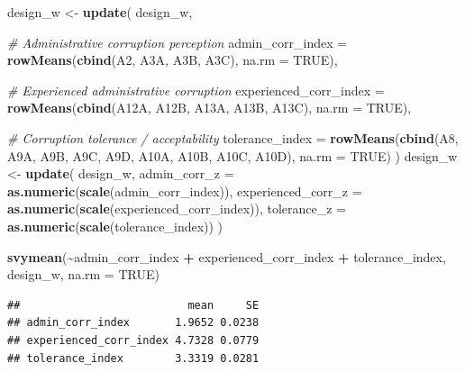 \documentclass[
]{article}
\newenvironment{Shaded}{\begin{snugshade}}{\end{snugshade}}
\newcommand{\AttributeTok}[1]{\textcolor[rgb]{0.13,0.29,0.53}{#1}}
\newcommand{\CommentTok}[1]{\textcolor[rgb]{0.56,0.35,0.01}{\textit{#1}}}
\newcommand{\ConstantTok}[1]{\textcolor[rgb]{0.56,0.35,0.01}{#1}}
\newcommand{\FunctionTok}[1]{\textcolor[rgb]{0.13,0.29,0.53}{\textbf{#1}}}
\newcommand{\NormalTok}[1]{#1}
\newcommand{\OtherTok}[1]{\textcolor[rgb]{0.56,0.35,0.01}{#1}}
\newcommand{\SpecialCharTok}[1]{\textcolor[rgb]{0.81,0.36,0.00}{\textbf{#1}}}
\begin{document}
\begin{Shaded}
\begin{Highlighting}[]
\NormalTok{design\_w }\OtherTok{\textless{}{-}} \FunctionTok{update}\NormalTok{(}
\NormalTok{  design\_w,}

  \CommentTok{\# Administrative corruption perception}
  \AttributeTok{admin\_corr\_index =} \FunctionTok{rowMeans}\NormalTok{(}\FunctionTok{cbind}\NormalTok{(A2, A3A, A3B, A3C), }\AttributeTok{na.rm =} \ConstantTok{TRUE}\NormalTok{),}

  \CommentTok{\# Experienced administrative corruption}
  \AttributeTok{experienced\_corr\_index =} \FunctionTok{rowMeans}\NormalTok{(}\FunctionTok{cbind}\NormalTok{(A12A, A12B, A13A, A13B, A13C), }\AttributeTok{na.rm =} \ConstantTok{TRUE}\NormalTok{),}

  \CommentTok{\# Corruption tolerance / acceptability}
  \AttributeTok{tolerance\_index =} \FunctionTok{rowMeans}\NormalTok{(}\FunctionTok{cbind}\NormalTok{(A8, A9A, A9B, A9C, A9D, A10A, A10B, A10C, A10D), }\AttributeTok{na.rm =} \ConstantTok{TRUE}\NormalTok{)}
\NormalTok{)}
\NormalTok{design\_w }\OtherTok{\textless{}{-}} \FunctionTok{update}\NormalTok{(}
\NormalTok{  design\_w,}
  \AttributeTok{admin\_corr\_z =} \FunctionTok{as.numeric}\NormalTok{(}\FunctionTok{scale}\NormalTok{(admin\_corr\_index)),}
  \AttributeTok{experienced\_corr\_z =} \FunctionTok{as.numeric}\NormalTok{(}\FunctionTok{scale}\NormalTok{(experienced\_corr\_index)),}
  \AttributeTok{tolerance\_z =} \FunctionTok{as.numeric}\NormalTok{(}\FunctionTok{scale}\NormalTok{(tolerance\_index))}
\NormalTok{)}
\end{Highlighting}
\end{Shaded}

\begin{Shaded}
\begin{Highlighting}[]
\FunctionTok{svymean}\NormalTok{(}\SpecialCharTok{\textasciitilde{}}\NormalTok{admin\_corr\_index }\SpecialCharTok{+}\NormalTok{ experienced\_corr\_index }\SpecialCharTok{+}\NormalTok{ tolerance\_index, design\_w, }\AttributeTok{na.rm =} \ConstantTok{TRUE}\NormalTok{)}
\end{Highlighting}
\end{Shaded}

\begin{verbatim}
##                          mean     SE
## admin_corr_index       1.9652 0.0238
## experienced_corr_index 4.7328 0.0779
## tolerance_index        3.3319 0.0281
\end{verbatim}
\end{document}
